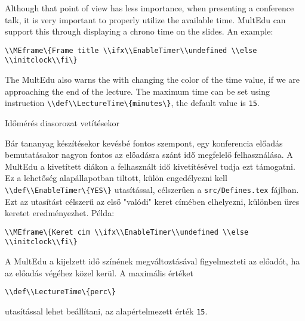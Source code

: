 {
Although that point of view has less importance, when presenting a conference talk,
it is very important to properly utilize the available time.
\gls{MultEdu} can support this through displaying a chrono time on the slides. An example:

\lstinline|\\MEframe\{Frame title \\ifx\\EnableTimer\\undefined \\else \\initclock\\fi\}|

The \gls{MultEdu} also warns the with changing the color of the time value,
if we are approaching the end of the lecture.
The maximum time can be set using instruction \lstinline|\\def\\LectureTime\{minutes\}|,
the default value is \lstinline|15|.
}
{Időmérés diasorozat vetítésekor}
{
Bár tananyag készítésekor kevésbé fontos szempont, egy konferencia előadás bemutatásakor
nagyon fontos az előadásra szánt idő megfelelő felhasználása.
A \gls{MultEdu} a kivetített diákon a felhasznált idő  kivetítésével tudja ezt támogatni.
Ez a lehetőség alapállapotban tiltott, külön engedélyezni kell \lstinline|\\def\\EnableTimer\{YES\}| utasítással,
célszerűen a \lstinline|src/Defines.tex| fájlban.
Ezt az utasítást célszerű az első "valódi" keret címében elhelyezni, különben üres keretet eredményezhet.
Példa:

\lstinline|\\MEframe\{Keret cim \\ifx\\EnableTimer\\undefined \\else \\initclock\\fi\}|

A \gls{MultEdu} a kijelzett idő színének megváltoztásával figyelmezteti az előadót, ha az előadás végéhez közel kerül. A maximális értéket

\lstinline|\\def\\LectureTime\{perc\}|

utasítással 
lehet beállítani, az alapértelmezett érték \lstinline|15|.
}


